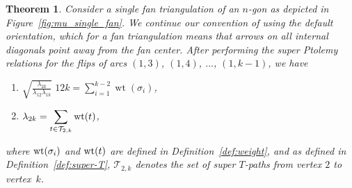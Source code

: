 \documentclass[pdftex]{sigma}
\numberwithin{equation}{section}
\newtheorem{Theorem}{Theorem}[section]
\DeclareMathOperator{\wt}{wt}
\renewcommand{\l}[2]{\lambda_{#1#2}}
\begin{document}
\begin{Theorem} \label{thm:mu_single_fan}
 Consider a single fan triangulation of an $n$-gon as depicted in Figure~{\rm \ref{fig:mu_single_fan}}. We continue our convention of using the default orientation,
 which for a fan triangulation means that arrows on all internal diagonals point away from the fan center.
 After performing the super Ptolemy relations for the flips of arcs $(1,3)$, $(1,4)$, $\dots$, $(1,k-1)$, we have
 \begin{enumerate}\itemsep=0pt
 \item[$(a)$] $\displaystyle \sqrt{\frac{\l2k}{\l12\l1k}} \; \boxed{12k} = \sum_{i=1}^{k-2}\wt(\sigma_i)$,
 \item[$(b)$] $\displaystyle \lambda_{2k} = \sum_{t \in \mathcal{T}_{2,k}} {\rm wt}(t)$,
 \end{enumerate}
 where ${\rm wt}(\sigma_i)$ and ${\rm wt}(t)$ are defined in Definition~{\rm \ref{def:weight}}, and as defined in Definition~{\rm \ref{def:super-T}}, $\mathcal{T}_{2,k}$ denotes the set of super $T$-paths from vertex $2$ to vertex~$k$.
\end{Theorem}
\end{document}

